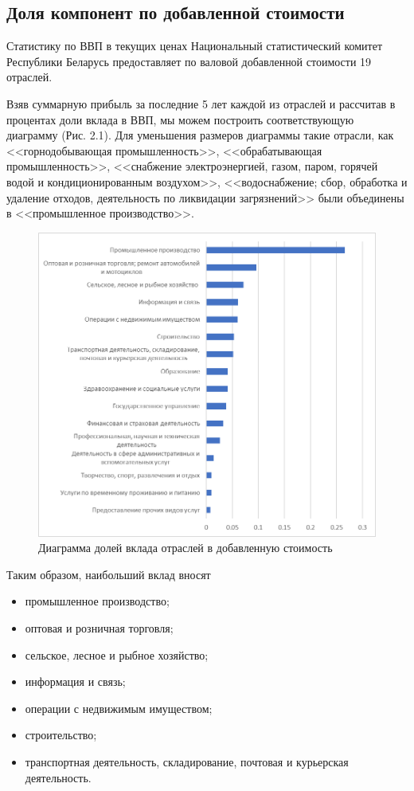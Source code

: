 \documentclass[a4paper, 14pt]{extreport}
\numberwithin{equation}{section}
\numberwithin{equation}{section}
\begin{document}
	\subsection{Доля компонент по добавленной стоимости}
	
	Статистику по ВВП в текущих ценах Национальный статистический комитет Республики Беларусь предоставляет по валовой добавленной стоимости 19 отраслей.	
	
	Взяв суммарную прибыль за последние 5 лет каждой из отраслей и рассчитав в процентах доли вклада в ВВП, мы можем построить соответствующую диаграмму (Рис. 2.1). Для уменьшения размеров диаграммы такие отрасли, как <<горнодобывающая промышленность>>, <<обрабатывающая промышленность>>, <<снабжение электроэнергией, газом, паром, горячей водой и кондиционированным воздухом>>, <<водоснабжение; сбор, обработка и удаление отходов, деятельность по ликвидации загрязнений>> были объединены в <<промышленное производство>>.
	
	\begin{figure}[h!]
		\centering
		\includegraphics[scale=1.0]{images/image01}
		\caption{Диаграмма долей вклада отраслей в добавленную стоимость}
		\label{fig:image01}
	\end{figure}
	Таким образом, наибольший вклад вносят
	\begin{itemize}
		\item промышленное производство;
		\item оптовая и розничная торговля;
		\item сельское, лесное и рыбное хозяйство;
		\item информация и связь;
		\item операции с недвижимым имуществом;
		\item строительство;
		\item транспортная деятельность, складирование, почтовая и курьерская деятельность.
	\end{itemize}
	
\end{document}

